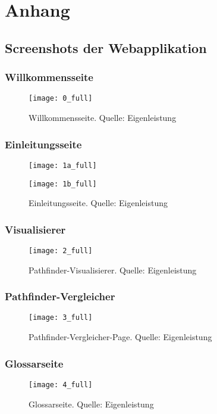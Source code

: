 \chapter{Anhang}
\section{Screenshots der Webapplikation}
\subsection{Willkommensseite}
\begin{figure}[H]
  \centering
  \texttt{[image: 0\_full]}
  \caption[Ein vollständiger Screenshot der Willkommensseite.]{Willkommensseite. Quelle: Eigenleistung}
  \label{fig:welcome_screenshot}
\end{figure}
\subsection{Einleitungsseite}
\begin{figure}[H]
  \centering
  \texttt{[image: 1a\_full]}
\end{figure}
\begin{figure}[H]
  \centering
  \texttt{[image: 1b\_full]}
  \caption[Ein vollständiger Screenshot der Eileitungsseite.]{Einleitungsseite. Quelle: Eigenleistung}
  \label{fig:intro_screenshot}
\end{figure}
\subsection{Visualisierer}
\begin{figure}[H]
  \centering
  \texttt{[image: 2\_full]}
  \caption[Ein vollständiger Screenshot der Visualisierers.]{Pathfinder-Visualisierer. Quelle: Eigenleistung}
  \label{fig:visualizer_screenshot}
\end{figure}
\subsection{Pathfinder-Vergleicher}
\begin{figure}[H]
  \centering
  \texttt{[image: 3\_full]}
  \caption[Ein vollständiger Screenshot des Pathfinder-Vergleichers.]{Pathfinder-Vergleicher-Page. Quelle: Eigenleistung}
  \label{fig:comparator_screenshot}
\end{figure}
\subsection{Glossarseite}
\begin{figure}[H]
  \centering
  \texttt{[image: 4\_full]}
  \caption[Ein vollständiger Screenshot der Glossarseite.]{Glossarseite. Quelle: Eigenleistung}
  \label{fig:glossary_screenshot}
\end{figure}

